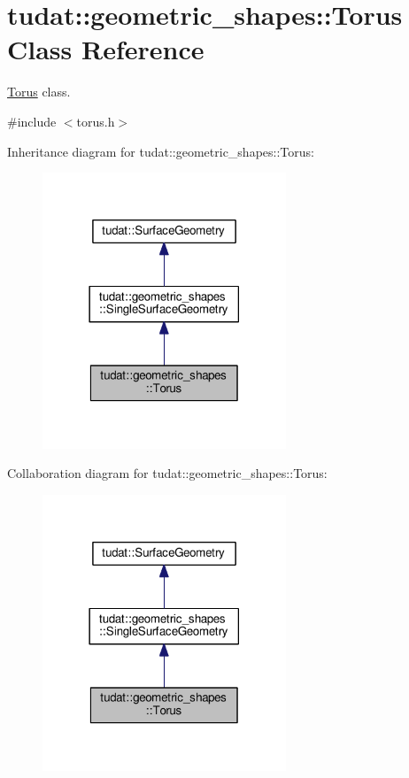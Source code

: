 \hypertarget{classtudat_1_1geometric__shapes_1_1Torus}{}\section{tudat\+:\+:geometric\+\_\+shapes\+:\+:Torus Class Reference}
\label{classtudat_1_1geometric__shapes_1_1Torus}


\hyperlink{classtudat_1_1geometric__shapes_1_1Torus}{Torus} class.  




{\ttfamily \#include $<$torus.\+h$>$}



Inheritance diagram for tudat\+:\+:geometric\+\_\+shapes\+:\+:Torus\+:
\nopagebreak
\begin{figure}[H]
\begin{center}
\leavevmode
\includegraphics[width=206pt]{classtudat_1_1geometric__shapes_1_1Torus__inherit__graph}
\end{center}
\end{figure}


Collaboration diagram for tudat\+:\+:geometric\+\_\+shapes\+:\+:Torus\+:
\nopagebreak
\begin{figure}[H]
\begin{center}
\leavevmode
\includegraphics[width=206pt]{classtudat_1_1geometric__shapes_1_1Torus__coll__graph}
\end{center}
\end{figure}
